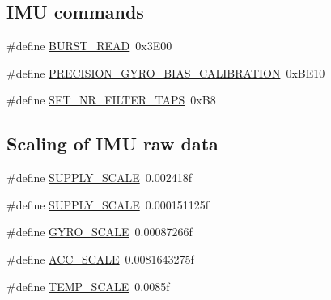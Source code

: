 \subsection*{\-I\-M\-U commands}
\begin{DoxyCompactItemize}
\item 
\#define \hyperlink{group__imu__interface_ga4cbbbb74258f1330950dddfd7e059885}{\-B\-U\-R\-S\-T\-\_\-\-R\-E\-A\-D}~0x3\-E00
\item 
\#define \hyperlink{group__imu__interface_ga95952a1aa5066a0ee395544b1d00f5b6}{\-P\-R\-E\-C\-I\-S\-I\-O\-N\-\_\-\-G\-Y\-R\-O\-\_\-\-B\-I\-A\-S\-\_\-\-C\-A\-L\-I\-B\-R\-A\-T\-I\-O\-N}~0x\-B\-E10
\item 
\#define \hyperlink{group__imu__interface_ga32b21aed5e8b0b591638c29805ea49a2}{\-S\-E\-T\-\_\-\-N\-R\-\_\-\-F\-I\-L\-T\-E\-R\-\_\-\-T\-A\-P\-S}~0x\-B8
\end{DoxyCompactItemize}
\subsection*{\-Scaling of \-I\-M\-U raw data}
\begin{DoxyCompactItemize}
\item 
\#define \hyperlink{group__imu__interface_gacf1763c4ed2b219ea3a67c92d9740186}{\-S\-U\-P\-P\-L\-Y\-\_\-\-S\-C\-A\-L\-E}~0.\-002418f
\item 
\#define \hyperlink{group__imu__interface_gacf1763c4ed2b219ea3a67c92d9740186}{\-S\-U\-P\-P\-L\-Y\-\_\-\-S\-C\-A\-L\-E}~0.\-000151125f
\item 
\#define \hyperlink{group__imu__interface_gabdeac7f9288bf09fd6e1739d22ff8bea}{\-G\-Y\-R\-O\-\_\-\-S\-C\-A\-L\-E}~0.\-00087266f
\item 
\#define \hyperlink{group__imu__interface_ga12c7b17bb03dc66dac226cdfe74f3c2d}{\-A\-C\-C\-\_\-\-S\-C\-A\-L\-E}~0.\-0081643275f
\item 
\#define \hyperlink{group__imu__interface_ga37fc2eea145b1cf777795b062ce43500}{\-T\-E\-M\-P\-\_\-\-S\-C\-A\-L\-E}~0.\-0085f
\end{DoxyCompactItemize}
